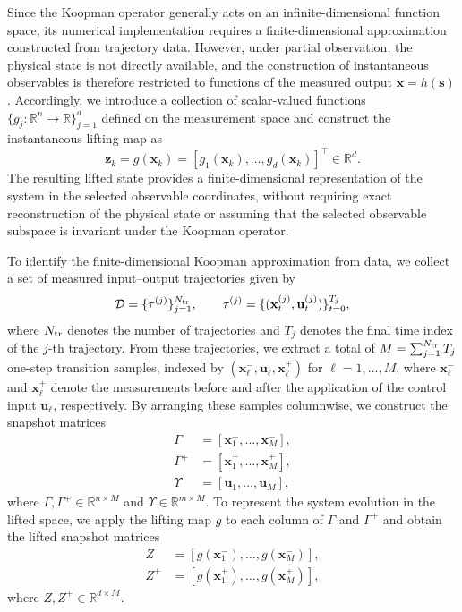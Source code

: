 \documentclass[journal]{IEEEtran}
\newcommand{\vx}{\mathbf{x}}
\newcommand{\vu}{\mathbf{u}}
\newcommand{\vs}{\mathbf{s}}
\newcommand{\vz}{\mathbf{z}}
\newcommand{\R}{\mathbb{R}}
\theoremstyle{plain}
\theoremstyle{definition}
\theoremstyle{definition}
\begin{document}
Since the Koopman operator generally acts on an infinite-dimensional
function space, its numerical implementation requires a
finite-dimensional approximation constructed from trajectory data. However, under partial observation, the physical state is not directly available, and the construction of instantaneous observables is therefore restricted to functions of the measured output $\vx=h(\vs)$. Accordingly, we introduce a collection of
scalar-valued functions $\{g_j:\R^n\to\R\}_{j=1}^{d}$ defined
on the measurement space and construct the instantaneous lifting
map as
\begin{equation}
\vz_k=g(\vx_k)
=[g_1(\vx_k),\ldots,g_d(\vx_k)]^\top\in\R^d.
\label{eq:instantaneous_lifting}
\end{equation}
The resulting lifted state provides a finite-dimensional
representation of the system in the selected observable coordinates, without requiring exact reconstruction of the physical state or assuming that the selected observable subspace is invariant under the Koopman operator.

To identify the finite-dimensional Koopman approximation from data,
we collect a set of measured input--output trajectories given by
\begin{equation}
\mathcal D=\{\tau^{(j)}\}_{j=1}^{N_{\rm tr}},\qquad
\tau^{(j)}=\{(\vx_t^{(j)},\vu_t^{(j)})\}_{t=0}^{T_j},
\label{eq:training_data}
\end{equation}
where $N_{\rm tr}$ denotes the number of trajectories and $T_j$
denotes the final time index of the $j$-th trajectory.
From these trajectories, we extract a total of
$M=\sum_{j=1}^{N_{\rm tr}}T_j$ one-step transition samples,
indexed by $(\vx_\ell^-,\vu_\ell,\vx_\ell^+)$ for
$\ell=1,\ldots,M$, where $\vx_\ell^-$ and $\vx_\ell^+$ denote
the measurements before and after the application of the control
input $\vu_\ell$, respectively.
By arranging these samples columnwise, we construct the snapshot
matrices
\begin{equation}
\begin{aligned}
\Gamma   &= [\vx_1^-,\ldots,\vx_M^-],\\
\Gamma^+ &= [\vx_1^+,\ldots,\vx_M^+],\\
\Upsilon &= [\vu_1,\ldots,\vu_M],
\end{aligned}
\label{eq:edmd_snapshot_matrices}
\end{equation}
where $\Gamma,\Gamma^+\in\R^{n\times M}$ and
$\Upsilon\in\R^{m\times M}$.
To represent the system evolution in the lifted space, we apply
the lifting map $g$ to each column of $\Gamma$ and $\Gamma^+$
and obtain the lifted snapshot matrices
\begin{equation}
\begin{aligned}
Z   &= [g(\vx_1^-),\ldots,g(\vx_M^-)],\\
Z^+ &= [g(\vx_1^+),\ldots,g(\vx_M^+)],
\end{aligned}
\label{eq:edmd_lifted_matrices}
\end{equation}
where $Z,Z^+\in\R^{d\times M}$.
\end{document}
